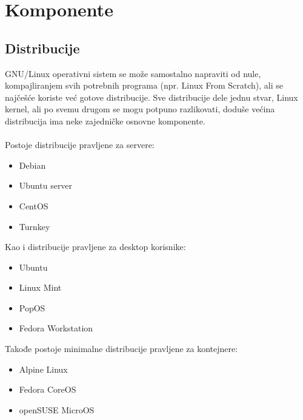 \documentclass[a4paper,14pt]{article}
\begin{document}
\begin{figure}[h]
	\centering
    \hspace{1cm}
\end{figure}
\newpage

\section{Komponente}

\subsection{Distribucije}
GNU/Linux operativni sistem se može samostalno napraviti od nule, kompajliranjem svih potrebnih programa (npr. Linux From Scratch), ali se najčešće koriste već gotove distribucije. Sve distribucije dele jednu stvar, Linux kernel, ali po svemu drugom se mogu potpuno razlikovati, doduše većina distribucija ima neke zajedničke osnovne komponente.
\\\\
Postoje distribucije pravljene za servere:
\begin{itemize}
\item Debian
\item Ubuntu server
\item CentOS
\item Turnkey
\end{itemize}
Kao i distribucije pravljene za desktop korisnike:
\begin{itemize}
\item Ubuntu
\item Linux Mint
\item PopOS
\item Fedora Workstation
\end{itemize}
Takođe postoje minimalne distribucije pravljene za kontejnere:
\begin{itemize}
\item Alpine Linux
\item Fedora CoreOS
\item openSUSE MicroOS
\end{itemize}
\newpage
\end{document}
